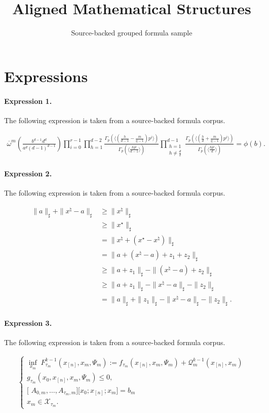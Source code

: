 \documentclass[11pt]{article}
\title{Aligned Mathematical Structures}
\author{Source-backed grouped formula sample}
\date{}
\begin{document}
\maketitle
\section{Expressions}
\paragraph{Expression 1.} The following expression is taken from a source-backed formula corpus.

\begin{align*}\overline{\omega}^m\left(\frac{b^{d-1}d^d}{a^d(d-1)^{d-1}}\right)\prod_{i=0}^{r-1}\prod_{h=1}^{d-2}\frac{\Gamma_p(\langle(\frac{h}{d-1}-\frac{m}{q-1})p^i\rangle)}{\Gamma_p(\langle\frac{hp^i}{d-1}\rangle)}\prod_{\substack{h=1\\h\neq\frac{d}{2}}}^{d-1}\frac{\Gamma_p(\langle(\frac{h}{d}+\frac{m}{q-1})p^i\rangle)}{\Gamma_p(\langle\frac{hp^i}{d}\rangle)}=\phi(b).\end{align*}

\paragraph{Expression 2.} The following expression is taken from a source-backed formula corpus.

\begin{align*}\|a\|_\sharp+\|x^\natural-a\|_\sharp&\geq\|x^\natural\|_\sharp\\&\geq\|x^\star\|_\sharp\\&=\|x^\natural+(x^\star-x^\natural)\|_\sharp\\&=\|a+(x^\natural-a)+z_1+z_2\|_\sharp\\&\geq\|a+z_1\|_\sharp-\|(x^\natural-a)+z_2\|_\sharp\\&\geq\|a+z_1\|_\sharp-\|x^\natural-a\|_\sharp-\|z_2\|_\sharp\\&=\|a\|_\sharp+\|z_1\|_\sharp-\|x^\natural-a\|_\sharp-\|z_2\|_\sharp.\end{align*}

\paragraph{Expression 3.} The following expression is taken from a source-backed formula corpus.

\begin{align*} \left\{\begin{array}{l}\displaystyle \inf_{x_m} \;F_{\tau_m}^{k-1}(x_{[n]}, x_m, \Psi_{m}):=f_{\tau_m}(x_{[n]}, x_m, \Psi_{m}) + \mathcal{Q}_{m}^{k-1}(x_{[n]}, x_{m})\\g_{\tau_m}(x_0, x_{[n]}, x_{m}, \Psi_{m}) \leq 0,\\\text{[ } A_{0, m}, \ldots, A_{\tau_m, m}\text{]} \text{[}x_0; x_{[n]}; x_{m}\text{]}=b_m\\x_m \in \mathcal{X}_{\tau_m}.\end{array}\right.\end{align*}
\end{document}
